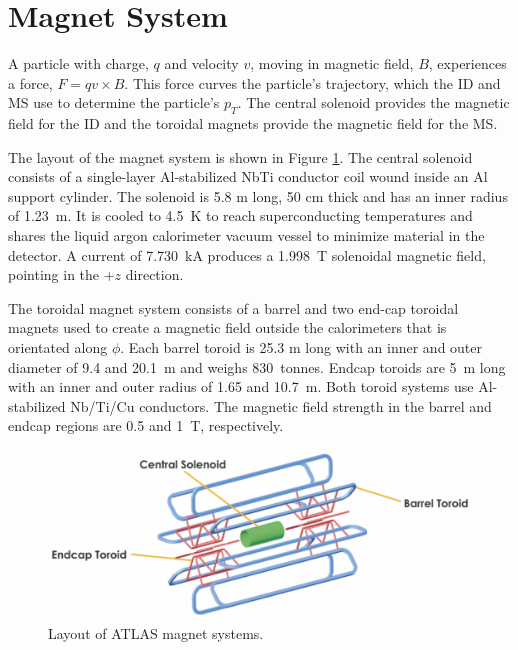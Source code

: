 \section{Magnet System}
A particle with charge, $q$ and velocity $v$, moving in magnetic field, $B$, experiences a force, $F= qv\times B$. This force curves the particle's trajectory, which the ID and MS use to determine the particle's $p_{T}$. The central solenoid provides the magnetic field for the ID and the toroidal magnets provide the magnetic field for the MS.

The layout of the magnet system is shown in Figure \ref{fig:atlas_magnets}. The central solenoid consists of a single-layer Al-stabilized NbTi conductor coil wound inside an Al support cylinder. The solenoid is 5.8 m long, 50 cm thick and has an inner radius of 1.23~m. It is cooled to 4.5~K to reach superconducting temperatures and shares the liquid argon calorimeter vacuum vessel to minimize material in the detector. A current of 7.730~kA produces a 1.998~T solenoidal magnetic field, pointing in the +$z$ direction. 

The toroidal magnet system consists of a barrel and two end-cap toroidal magnets used to create a magnetic field outside the calorimeters that is orientated along $\phi$. Each barrel toroid is 25.3 m long with an inner and outer diameter of 9.4 and 20.1~m and weighs 830~tonnes. Endcap toroids are 5~m long with an inner and outer radius of 1.65 and 10.7~m. Both toroid systems use Al-stabilized Nb/Ti/Cu conductors. The magnetic field strength in the barrel and endcap regions are 0.5 and 1~T, respectively.

\begin{figure}[h!]
  \centering
  \includegraphics[width=\hsize]{figures/Detector/atlas_magnets.png}
  \caption{Layout of ATLAS magnet systems.} 
  \label{fig:atlas_magnets}
\end{figure}
\FloatBarrier


